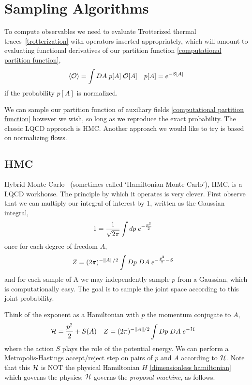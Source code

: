 \section{Sampling Algorithms}\label{sec:sampling}

To compute observables we need to evaluate Trotterized thermal traces~\eqref{trotterization} with operators inserted appropriately, which will amount to evaluating functional derivatives of our partition function \eqref{computational partition function},
\begin{align}
	\left\langle \mathcal{O} \right\rangle &= \int DA\; p[A]\; \mathcal{O}[A]
	&
	p[A] = e^{-S[A]}
\end{align}
if the probability $p[A]$ is normalized.

We can sample our partition function of auxiliary fields \eqref{computational partition function} however we wish, so long as we reproduce the exact probability.
The classic LQCD approach is HMC.
Another approach we would like to try is based on normalizing flows.

\subsection{HMC}

Hybrid Monte Carlo~\cite{Duane1987} (sometimes called `Hamiltonian Monte Carlo'), HMC, is a LQCD workhorse.
The principle by which it operates is very clever.
First observe that we can multiply our integral of interest by 1, written as the Gaussian integral,
\begin{align}
	1 &= \frac{1}{\sqrt{2\pi}} \int dp\; e^{-\frac{p^2}{2}}
\end{align}
once for each degree of freedom $A$,
\begin{align}
	Z &= (2\pi)^{-\left\| A \right\|/2} \int Dp\; DA\; e^{-\frac{p^2}{2} - S}
\end{align}
and for each sample of A we may independently sample $p$ from a Gaussian, which is computationally easy.
The goal is to sample the joint space according to this joint probability.

Think of the exponent as a Hamiltonian \Ham with $p$ the momentum conjugate to $A$,
\begin{align}
	\mathcal{H} &= \frac{p^2}{2} + S(A)
	&
	Z &= (2\pi)^{-\left\| A \right\|/2} \int Dp\; DA\; e^{-\mathcal{H}}
\end{align}
where the action $S$ plays the role of the potential energy.
We can perform a Metropolis-Hastings accept/reject step on pairs of $p$ and $A$ according to $\mathcal{H}$.
Note that this $\mathcal{H}$ is NOT the physical Hamiltonian $H$ \eqref{dimensionless hamiltonian} which governs the physics; $\mathcal{H}$ governs the \emph{proposal machine}, as follows.

